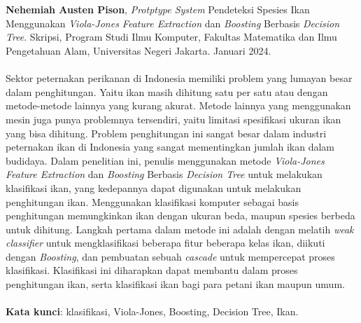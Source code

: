 \chapter*{}
\singlespacing{}

\textbf{Nehemiah Austen Pison}, \textit{Protptype System} Pendeteksi Spesies Ikan 
Menggunakan \textit{Viola-Jones Feature Extraction} dan \textit{Boosting} Berbasis 
\textit{Decision Tree}. Skripsi, Program Studi Ilmu Komputer, Fakultas Matematika dan Ilmu Pengetahuan Alam, Universitas Negeri Jakarta. Januari 2024.
\\
\\
Sektor peternakan perikanan di Indonesia memiliki problem yang lumayan besar dalam penghitungan. 
Yaitu ikan masih dihitung satu per satu atau dengan metode-metode lainnya yang kurang akurat. 
Metode lainnya yang menggunakan mesin juga punya problemnya tersendiri, yaitu limitasi 
spesifikasi ukuran ikan yang bisa dihitung. Problem penghitungan ini sangat besar dalam 
industri peternakan ikan di Indonesia yang sangat mementingkan jumlah ikan dalam budidaya. 
Dalam penelitian ini, penulis menggunakan 
metode \emph{Viola-Jones Feature Extraction} dan \textit{Boosting} Berbasis 
\emph{Decision Tree} untuk melakukan klasifikasi ikan, yang kedepannya dapat digunakan untuk 
melakukan penghitungan ikan. Menggunakan klasifikasi komputer sebagai basis penghitungan 
memungkinkan ikan dengan ukuran beda, maupun spesies berbeda untuk dihitung. 
Langkah pertama dalam metode ini adalah dengan melatih \emph{weak classifier} 
untuk mengklasifikasi beberapa fitur beberapa kelas ikan, diikuti dengan \emph{Boosting}, 
dan pembuatan sebuah \emph{cascade} untuk mempercepat proses klasifikasi. Klasifikasi 
ini diharapkan dapat membantu dalam proses penghitungan ikan, serta klasifikasi ikan 
bagi para petani ikan maupun umum. 
\\
\\
\textbf{Kata kunci}: klasifikasi, Viola-Jones, Boosting, Decision Tree, Ikan.
